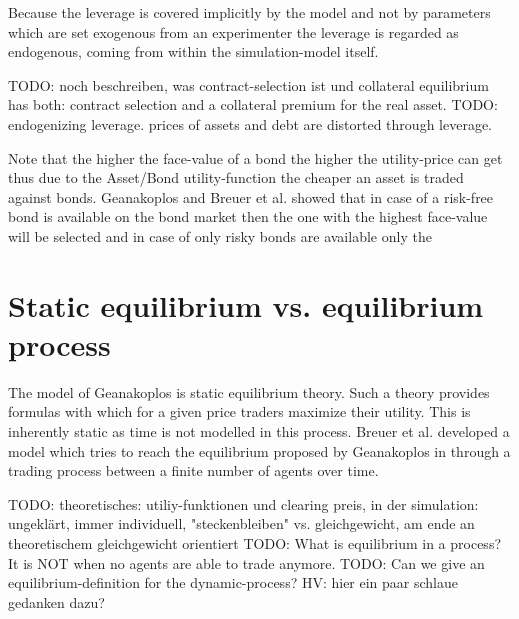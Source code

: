 \documentclass[../Bachelorarbeit.tex]{subfiles}
\begin{document}
\medskip

Because the leverage is covered implicitly by the model and not by parameters which are set exogenous from an experimenter the leverage is regarded as endogenous, coming from within the simulation-model itself.

\medskip
TODO: noch beschreiben, was contract-selection ist und collateral equilibrium has both: contract selection and a collateral premium for the real asset.
TODO: endogenizing leverage. prices of assets and debt are distorted through leverage.

Note that the higher the face-value of a bond the higher the utility-price can get thus due to the Asset/Bond utility-function the cheaper an asset is traded against bonds. Geanakoplos and Breuer et al. showed that in case of a risk-free bond is available on the bond market then the one with the highest face-value will be selected and in case of only risky bonds are available only the 


\section{Static equilibrium vs. equilibrium process}
The model of Geanakoplos is static equilibrium theory. Such a theory provides formulas with which for a given price traders maximize their utility. This is inherently static as time is not modelled in this process. Breuer et al. developed a model which tries to reach the equilibrium proposed by Geanakoplos in \cite{Geanakoplos2009} through a trading process between a finite number of agents over time.

\medskip

TODO: theoretisches: utiliy-funktionen und clearing preis, in der simulation: ungeklärt, immer individuell, "steckenbleiben" vs. gleichgewicht, am ende an theoretischem gleichgewicht orientiert
TODO: What is equilibrium in a process? It is NOT when no agents are able to trade anymore.
TODO: Can we give an equilibrium-definition for the dynamic-process? HV: hier ein paar schlaue gedanken dazu?
\end{document}

